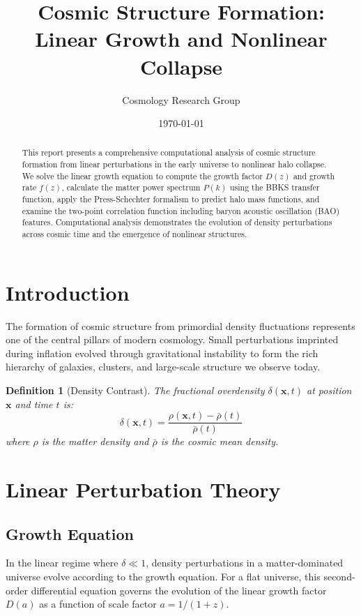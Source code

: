\documentclass[a4paper, 11pt]{article}
\title{Cosmic Structure Formation: Linear Growth and Nonlinear Collapse}
\author{Cosmology Research Group}
\date{\today}
\newtheorem{definition}{Definition}[section]
\begin{document}
\maketitle

\begin{abstract}
This report presents a comprehensive computational analysis of cosmic structure formation from
linear perturbations in the early universe to nonlinear halo collapse. We solve the linear
growth equation to compute the growth factor $D(z)$ and growth rate $f(z)$, calculate the
matter power spectrum $P(k)$ using the BBKS transfer function, apply the Press-Schechter
formalism to predict halo mass functions, and examine the two-point correlation function
including baryon acoustic oscillation (BAO) features. Computational analysis demonstrates the
evolution of density perturbations across cosmic time and the emergence of nonlinear structures.
\end{abstract}

\section{Introduction}

The formation of cosmic structure from primordial density fluctuations represents one of the
central pillars of modern cosmology. Small perturbations imprinted during inflation evolved
through gravitational instability to form the rich hierarchy of galaxies, clusters, and
large-scale structure we observe today.

\begin{definition}[Density Contrast]
The fractional overdensity $\delta(\mathbf{x}, t)$ at position $\mathbf{x}$ and time $t$ is:
\begin{equation}
\delta(\mathbf{x}, t) = \frac{\rho(\mathbf{x}, t) - \bar{\rho}(t)}{\bar{\rho}(t)}
\end{equation}
where $\rho$ is the matter density and $\bar{\rho}$ is the cosmic mean density.
\end{definition}

\section{Linear Perturbation Theory}

\subsection{Growth Equation}

In the linear regime where $\delta \ll 1$, density perturbations in a matter-dominated universe
evolve according to the growth equation. For a flat universe, this second-order differential
equation governs the evolution of the linear growth factor $D(a)$ as a function of scale factor
$a = 1/(1+z)$.
\end{document}
